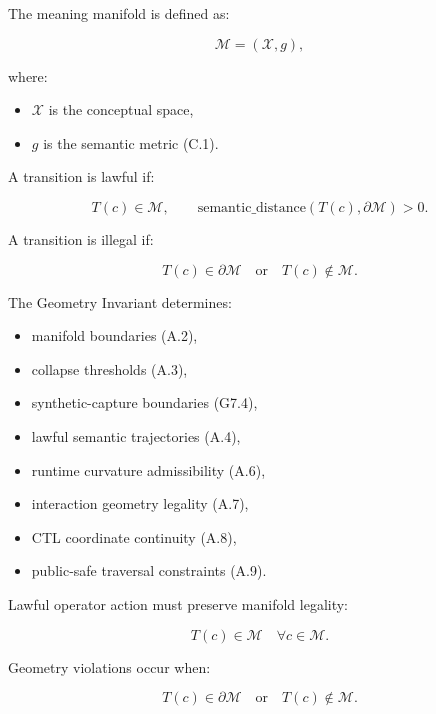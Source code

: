 \medskip

\noindent The meaning manifold is defined as:


\[
\mathcal{M} = (\mathcal{X}, g),
\]


where:
\begin{itemize}
    \item $\mathcal{X}$ is the conceptual space,
    \item $g$ is the semantic metric (C.1).
\end{itemize}

\medskip

\noindent A transition is lawful if:


\[
T(c) \in \mathcal{M},
\qquad
\text{semantic\_distance}(T(c), \partial\mathcal{M}) > 0.
\]



A transition is illegal if:


\[
T(c) \in \partial\mathcal{M}
\quad \text{or} \quad
T(c) \notin \mathcal{M}.
\]



\medskip

\noindent The Geometry Invariant determines:
\begin{itemize}
    \item manifold boundaries (A.2),
    \item collapse thresholds (A.3),
    \item synthetic-capture boundaries (G7.4),
    \item lawful semantic trajectories (A.4),
    \item runtime curvature admissibility (A.6),
    \item interaction geometry legality (A.7),
    \item CTL coordinate continuity (A.8),
    \item public-safe traversal constraints (A.9).
\end{itemize}

\medskip

\noindent Lawful operator action must preserve manifold legality:


\[
T(c) \in \mathcal{M}
\quad \forall c \in \mathcal{M}.
\]



\noindent Geometry violations occur when:


\[
T(c) \in \partial\mathcal{M}
\quad \text{or} \quad
T(c) \notin \mathcal{M}.
\]



\medskip

